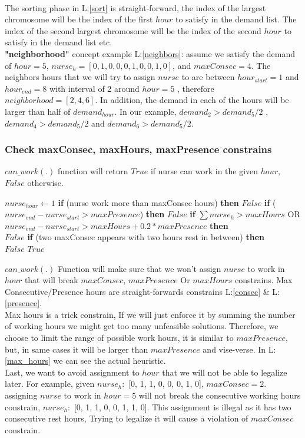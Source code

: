 \documentclass{article}
\newcommand\tab[1][1cm]{\hspace*{#1}}
\begin{document}
\\\tab The sorting phase in L:\ref{sort} is straight-forward, the index of the largest chromosome will be the index of the first $hour$ to satisfy in the demand list. The index of the second largest chromosome will be the index of the second $hour$ to satisfy in the demand list etc.
\\\tab \textbf{"neighborhood"} concept example L:\ref{neighbors}: assume we satisfy the demand of $hour=5$, $nurse_h = [0,1,0,0,0,1,0,0,1,0]$, and $maxConsec=4$. The neighbors hours that we will try to assign $nurse$ to are between $hour_{start} = 1$ and $hour_{end} = 8$ with interval of 2 around $hour=5$ , therefore $neighborhood = [2,4,6]$. In addition, the demand in each of the hours will be larger than half of $demand_{hour}$. In our example, $demand_2 >demand_5/2$ , $demand_4 >demand_5/2$ and $demand_6 >demand_5/2$.
\newpage
	\subsubsection{Check maxConsec, maxHours, maxPresence constrains}
\tab $can\_work(.)$ function will return $True$ if nurse can work in the given $hour$, $False$ otherwise.
	\begin{algorithmic}[1]
	    \State $nurse_{hour} \leftarrow 1$
	    \State \textbf{if} (nurse work more than maxConsec hours) \textbf{then} \Return $False$ \label{consec}
	    \State \textbf{if} ($nurse_{end} - nurse_{start} > maxPresence $) \textbf{then} \Return $False$ \label{presence}
	    \State \textbf{if} $\sum{nurse_h} > maxHours$ OR \label{max_hours}
	    \\\tab $nurse_{end} - nurse_{start} > maxHours + 0.2*maxPresence $ \textbf{then} 
	    \\\tab \Return $False$
	    \State \textbf{if} (two maxConsec appears with two hours rest in between) \textbf{then} \label{consec_rest}
	    \\\tab \Return $False$
	    \State \Return $True$
	\EndFunction
	\end{algorithmic}
\tab \textbf{$can\_work(.)$} Function will make sure that we won't assign $nurse$ to work in $hour$ that will break \textbf{$maxConsec$}, \textbf{$maxPresence$} Or \textbf{$maxHours$} constrains. Max Consecutive/Presence hours are straight-forwards constrains L:\ref{consec} \& L:\ref{presence}.\\ Max hours is a trick constrain, If we will just enforce it by summing the number of working hours we might get too many unfeasible solutions. Therefore, we choose to limit the range of possible work hours, it is similar to \textbf{$maxPresence$}, but, in same cases it will be larger than \textbf{$maxPresence$} and vise-verse. In L:\ref{max_hours} we can see the actual heuristic.
\\\tab Last, we want to avoid assignment to \textbf{$hour$} that we will not be able to legalize later. For example, given $nurse_h:$ {[}0, 1, 1, 0, 0, 0, 1, 0{]}, $maxConsec=2$. assigning $nurse$ to work in $hour=5$ will not break the consecutive working hours constrain, $nurse_h:$ {[}0, 1, 1, 0, 0, 1, 1, 0{]}. This assignment is illegal as it has two consecutive rest hours, Trying to legalize it will cause a violation of \textbf{$maxConsec$} constrain.
\end{document}
